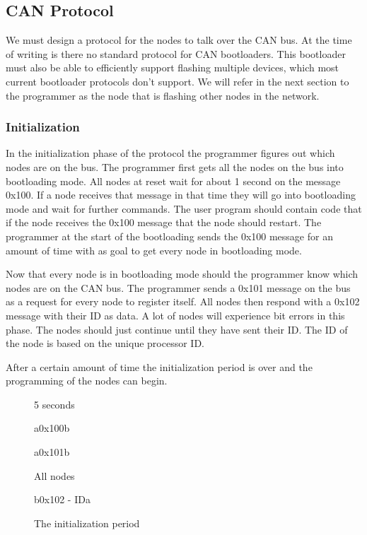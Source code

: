 \documentclass[twocolumn]{article}
\begin{document}
	
	\subsection*{CAN Protocol}
		We must design a protocol for the nodes to talk over the CAN bus.
		At the time of writing is there no standard protocol for CAN bootloaders.
		This bootloader must also be able to efficiently support flashing multiple devices,
		which most current bootloader protocols don't support.
		We will refer in the next section to the programmer as the node that is flashing other nodes in the network.
			
		\subsubsection*{Initialization}
			In the initialization phase of the protocol the programmer figures out which nodes are on the bus.
			The programmer first gets all the nodes on the bus into bootloading mode.
			All nodes at reset wait for about 1 second on the message 0x100.
			If a node receives that message in that time they will go into bootloading mode and wait for further commands.
			The user program should contain code that if the node receives the 0x100 message that the node should restart.
			The programmer at the start of the bootloading sends the 0x100 message for an amount of time with as goal to get every node in bootloading mode.
			
			Now that every node is in bootloading mode should the programmer know which nodes are on the CAN bus.
			The programmer sends a 0x101 message on the bus as a request for every node to register itself.
			All nodes then respond with a 0x102 message with their ID as data.
			A lot of nodes will experience bit errors in this phase.
			The nodes should just continue until they have sent their ID.
			The ID of the node is based on the unique processor ID.
			
			After a certain amount of time the initialization period is over and the programming of the nodes can begin.
		
			\begin{figure}[t]
				\centering
				\begin{sequencediagram}
				
					\begin{sdloop}{5 seconds}
						\begin{call}{a}{0x100}{b}{}
						\end{call}
					\end{sdloop}
				
					\begin{call}{a}{0x101}{b}{}
						\begin{sdloop}{All nodes}
							\begin{call}{b}{0x102 - ID}{a}{}
							\end{call}
						\end{sdloop}
					\end{call}
				\end{sequencediagram}
				\caption{The initialization period}
			\end{figure}
		
\end{document}
